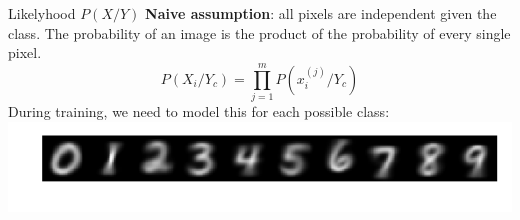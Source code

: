 \bgroup  
\begin{frame}{Likelyhood $P(X/Y)$}
\textbf{Naive assumption}: all pixels are independent given the class. The probability of an image is the product of the probability of every single pixel.\\
\begin{equation*}
P(X_i/Y_c)=\prod_{j=1}^m P(x_i^{(j)}/Y_c)
\end{equation*}
During training, we need to model this for each possible class:
\includegraphics[width=\textwidth]{img/lkl_model.pdf}
\end{frame}
\egroup